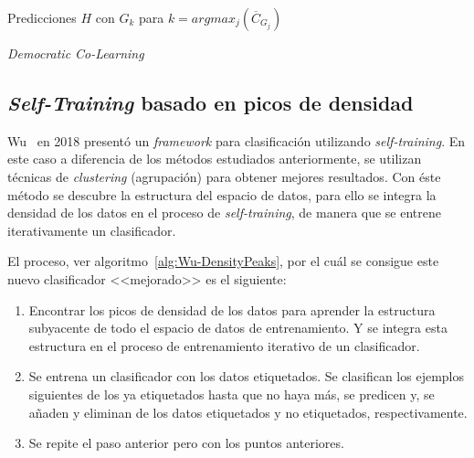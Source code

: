 \begin{algorithm}[H]
	\AlgoRestoreLineCount
	Predicciones $H$ con $G_k$ para $k = argmax_j\left(\overline{C}_{G_{j}}\right)$
	\caption{\textit{Democratic Co-Learning}}\label{alg:Democratic-Co-2}
\end{algorithm}

\subsection{\textit{Self-Training} basado en picos de densidad}
Wu~\cite{wu2018self} en 2018 presentó un \textit{framework} para clasificación utilizando \textit{self-training}. En este caso a diferencia de los métodos estudiados anteriormente, se utilizan técnicas de \textit{clustering} (agrupación) para obtener mejores resultados. Con éste método se descubre la  estructura del espacio de datos, para ello se integra la densidad de los datos en el proceso de \textit{self-training}, de manera que se entrene iterativamente un clasificador. 

El proceso, ver algoritmo~\ref{alg:Wu-DensityPeaks}, por el cuál se consigue este nuevo clasificador <<mejorado>> es el siguiente:
\begin{enumerate}
\item Encontrar los picos de densidad de los datos para aprender la estructura subyacente de todo el espacio de datos de entrenamiento. Y se integra esta estructura en el proceso de entrenamiento iterativo de un clasificador.
\item Se entrena un clasificador con los datos etiquetados. Se clasifican los ejemplos siguientes de los ya etiquetados hasta que no haya más, se predicen y, se añaden y eliminan de los datos etiquetados y no etiquetados, respectivamente.
\item Se repite el paso anterior pero con los puntos anteriores.
\end{enumerate}

